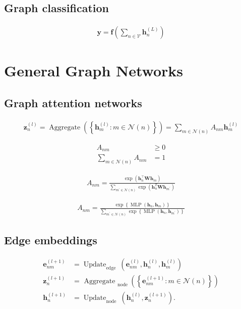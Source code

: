 \documentclass{article}
\begin{document}
\subsection{Graph classification}
\begin{align*}
\mathbf{y}=\mathbf{f}\left(\sum_{n \in \mathcal{V}} \mathbf{h}_{n}^{(L)}\right) \tag{13.23}
\end{align*}

\section{General Graph Networks}

\subsection{Graph attention networks}
\begin{align*}
\mathbf{z}_{n}^{(l)}=\operatorname{Aggregate}\left(\left\{\mathbf{h}_{m}^{(l)}: m \in \mathcal{N}(n)\right\}\right)=\sum_{m \in \mathcal{N}(n)} A_{n m} \mathbf{h}_{m}^{(l)} \tag{13.24}
\end{align*}

\begin{align*}
A_{n m} & \geqslant 0  \tag{13.25}\\
\sum_{m \in \mathcal{N}(n)} A_{n m} & =1
 \tag{13.26}
\end{align*}

\begin{align*}
A_{n m}=\frac{\exp \left(\mathbf{h}_{n}^{\top} \mathbf{W} \mathbf{h}_{m}\right)}{\sum_{m^{\prime} \in \mathcal{N}(n)} \exp \left(\mathbf{h}_{n}^{T} \mathbf{W} \mathbf{h}_{m^{\prime}}\right)} \tag{13.27}
\end{align*}

\begin{align*}
A_{n m}=\frac{\exp \left\{\operatorname{MLP}\left(\mathbf{h}_{n}, \mathbf{h}_{m}\right)\right\}}{\sum_{m^{\prime} \in \mathcal{N}(n)} \exp \left\{\operatorname{MLP}\left(\mathbf{h}_{n}, \mathbf{h}_{m^{\prime}}\right)\right\}} \tag{13.28}
\end{align*}

\subsection{Edge embeddings}
\begin{align*}
\mathbf{e}_{n m}^{(l+1)} & =\operatorname{Update}_{\text{edge }}\left(\mathbf{e}_{n m}^{(l)}, \mathbf{h}_{n}^{(l)}, \mathbf{h}_{m}^{(l)}\right)  \tag{13.29}\\
\mathbf{z}_{n}^{(l+1)} & =\text{ Aggregate }_{\text{node }}\left(\left\{\mathbf{e}_{n m}^{(l+1)}: m \in \mathcal{N}(n)\right\}\right)  \tag{13.30}\\
\mathbf{h}_{n}^{(l+1)} & =\operatorname{Update}_{\text{node }}\left(\mathbf{h}_{n}^{(l)}, \mathbf{z}_{n}^{(l+1)}\right) . \tag{13.31}
\end{align*}
\end{document}

